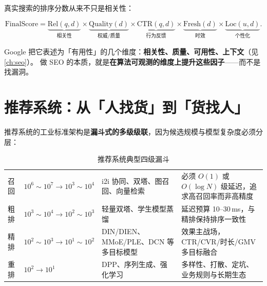 真实搜索的排序分数从来不只是相关性：

\begin{equation}
\text{FinalScore} = \underbrace{\text{Rel}(q,d)}_{\text{相关性}} \times
\underbrace{\text{Quality}(d)}_{\text{权威/质量}} \times
\underbrace{\text{CTR}(q,d)}_{\text{行为反馈}} \times
\underbrace{\text{Fresh}(d)}_{\text{时效}} \times
\underbrace{\text{Loc}(u,d)}_{\text{个性化}} .
\end{equation}

Google 把它表述为「有用性」的几个维度：\textbf{相关性、质量、可用性、上下文}（见\cref{ch:seo}）。
做 SEO 的本质，就是\textbf{在算法可观测的维度上提升这些因子}——而不是找漏洞。

\section{推荐系统：从「人找货」到「货找人」}

推荐系统的工业标准架构是\textbf{漏斗式的多级级联}，因为候选规模与模型复杂度必须分层：

\begin{table}[htbp]
\centering
\caption{推荐系统典型四级漏斗}
\label{tab:funnel}
\small
\begin{tabularx}{\textwidth}{L{1.6cm} L{2.0cm} L{2.3cm} Y}
\toprule
{} &  &  &  \\
\midrule
召回 & $10^6 \sim 10^7 \to 10^3 \sim 10^4$ &
i2i 协同、双塔、图召回、向量检索 &
必须 $O(1)$ 或 $O(\log N)$ 级延迟，追求高召回率而非高精度 \\
\addlinespace
粗排 & $10^3 \sim 10^4 \to 10^2 \sim 10^3$ &
轻量双塔、学生模型蒸馏 &
延迟预算 10--30\,ms，与精排保持排序一致性 \\
\addlinespace
精排 & $10^2 \sim 10^3 \to 10^1 \sim 10^2$ &
DIN/DIEN、MMoE/PLE、DCN 等多目标模型 &
效果主战场，CTR/CVR/时长/GMV 多目标融合 \\
\addlinespace
重排 & $10^2 \to 10^1$ &
DPP、序列生成、强化学习 &
多样性、打散、定坑、业务规则与长期生态 \\
\bottomrule
\end{tabularx}
\end{table}

